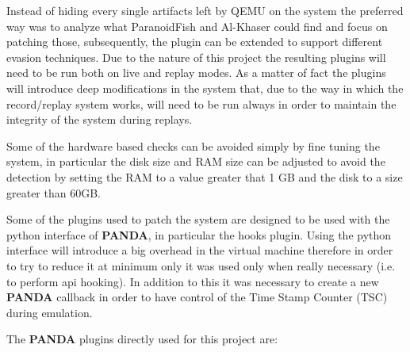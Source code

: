 Instead of hiding every single artifacts left by QEMU on the system the preferred way was to analyze what ParanoidFish and Al-Khaser could find and focus on patching those, subsequently, the plugin can be extended to support different evasion techniques. Due to the nature of this project the resulting plugins will need to be run both on live and replay modes. As a matter of fact the plugins will introduce deep modifications in the system that, due to the way in which the record/replay system works, will need to be run always in order to maintain the integrity of the system during replays.

Some of the hardware based checks can be avoided simply by fine tuning the system, in particular the disk size and RAM size can be adjusted to avoid the detection by setting the RAM to a value greater that 1 GB and the disk to a size greater than 60GB. 

Some of the plugins used to patch the system are designed to be used with the python interface of \textbf{PANDA}, in particular the hooks plugin. Using the python interface will introduce a big overhead in the virtual machine therefore in order to try to reduce it at minimum only it was used only when really necessary (i.e. to perform api hooking). In addition to this it was necessary to create a new \textbf{PANDA} callback in order to have control of the Time Stamp Counter (TSC) during emulation.  

The \textbf{PANDA} plugins directly used for this project are: 

